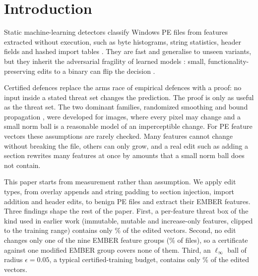 \documentclass[preprint,12pt,authoryear]{elsarticle}
\begin{document}
\section{Introduction}\label{sec:intro}
Static machine-learning detectors classify Windows PE files from features extracted without execution, such as byte histograms, string statistics, header fields and hashed import tables \citep{anderson2018ember,gibert2020rise}. They are fast and generalise to unseen variants, but they inherit the adversarial fragility of learned models \citep{szegedy2014intriguing,goodfellow2015explaining}: small, functionality-preserving edits to a binary can flip the decision \citep{grosse2017adversarial,kolosnjaji2018adversarial,anderson2018learning,demetrio2021exemples,pierazzi2020problemspace}.

Certified defences replace the arms race of empirical defences with a proof: no input inside a stated threat set changes the prediction. The proof is only as useful as the threat set. The two dominant families, randomized smoothing \citep{lecuyer2019certified,cohen2019certified} and bound propagation \citep{gowal2018ibp,zhang2018crown,zhang2020crownibp}, were developed for images, where every pixel may change and a small norm ball is a reasonable model of an imperceptible change. For PE feature vectors these assumptions are rarely checked. Many features cannot change without breaking the file, others can only grow, and a real edit such as adding a section rewrites many features at once by amounts that a small norm ball does not contain.

This paper starts from measurement rather than assumption. We apply \PsNEditTypesInScope{} edit types, from overlay appends and string padding to section injection, import addition and header edits, to \PsNFiles{} benign PE files and extract their EMBER features. Three findings shape the rest of the paper. First, a per-feature threat box of the kind used in earlier work (immutable, mutable and increase-only features, clipped to the training range) contains only \PsDraftBoxInsidePct\% of the \PsNEditedInScope{} edited vectors. Second, no edit changes only one of the nine EMBER feature groups (\PsGroupsLeOnePct\% of files), so a certificate against one modified EMBER group covers none of them. Third, an $\ell_\infty$ ball of radius $\epsilon=0.05$, a typical certified-training budget, contains only \PsEpsLeTrainPct\% of the edited vectors.
\end{document}

